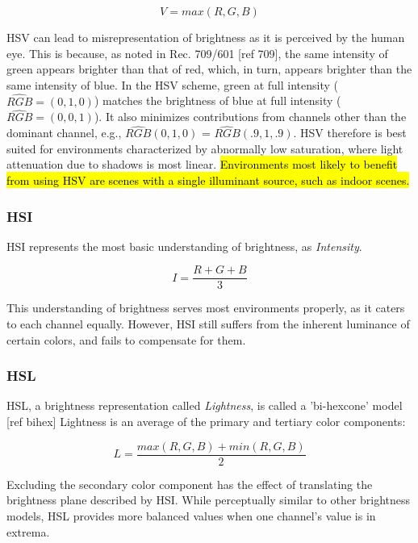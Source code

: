 \begin{equation}
V = max(R, G, B)
\label{eqn:hsv}
\end{equation}

HSV can lead to misrepresentation of brightness as it is perceived by the human eye. This is because, as noted in Rec. 709/601 [ref 709], the same intensity of green appears brighter than that of red, which, in turn, appears brighter than the same intensity of blue. In the HSV scheme, green at full intensity ($\hat{RGB} = (0, 1, 0)$) matches the brightness of blue at full intensity ($\hat{RGB} = (0, 0, 1)$). It also minimizes contributions from channels other than the dominant channel, e.g., $\hat{RGB}(0, 1, 0)$ = $\hat{RGB}(.9, 1, .9)$. HSV therefore is best suited for environments characterized by abnormally low saturation, where light attenuation due to shadows is most linear. \hl{Environments most likely to benefit from using HSV are scenes with a single illuminant source, such as indoor scenes.}

\subsubsection{HSI}

HSI represents the most basic understanding of brightness, as \textit{Intensity}. 

\begin{equation}
I = \dfrac{R + G + B}{3}
\end{equation}

This understanding of brightness serves most environments properly, as it caters to each channel equally. However, HSI still suffers from the inherent luminance of certain colors, and fails to compensate for them.

\subsubsection{HSL}

HSL, a brightness representation called \textit{Lightness}, is called a 'bi-hexcone' model [ref bihex] Lightness is an average of the primary and tertiary color components:

\begin{equation}
L = \dfrac{max(R,G,B) + min(R,G,B)}{2}
\end{equation}

Excluding the secondary color component has the effect of translating the brightness plane described by HSI. While perceptually similar to other brightness models, HSL provides more balanced values when one channel's value is in extrema.

